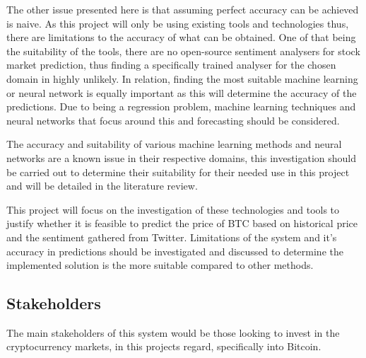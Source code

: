 \documentclass[oneside, 10pt]{article}
\begin{document}
		The other issue presented here is that assuming perfect accuracy can be achieved is naive. As this project will only be using existing tools and technologies thus, there are limitations to the accuracy of what can be obtained. One of that being the suitability of the tools, there are no open-source sentiment analysers for stock market prediction, thus finding a specifically trained analyser for the chosen domain in highly unlikely. In relation, finding the most suitable machine learning or neural network is equally important as this will determine the accuracy of the predictions. Due to being a regression problem, machine learning techniques and neural networks that focus around this and forecasting should be considered.
		
		The accuracy and suitability of various machine learning methods and neural networks are a known issue in their respective domains, this investigation should be carried out to determine their suitability for their needed use in this project and will be detailed in the literature review.
		
		This project will focus on the investigation of these technologies and tools to justify whether it is feasible to predict the price of BTC based on historical price and the sentiment gathered from Twitter. Limitations of the system and it's accuracy in predictions should be investigated and discussed to determine the implemented solution is the more suitable compared to other methods.  
		
		\subsection{Stakeholders}\label{stakeholders}
		The main stakeholders of this system would be those looking to invest in the cryptocurrency markets, in this projects regard, specifically into Bitcoin. 
		
\end{document}
